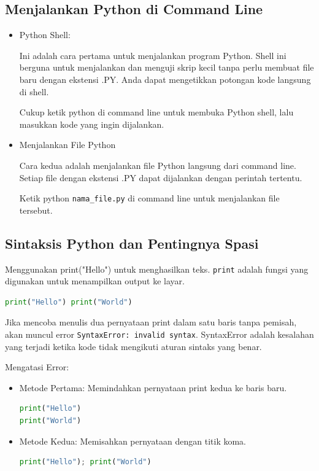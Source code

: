\documentclass{article}
\begin{document}
\subsection{Menjalankan Python di Command Line}
\begin{itemize}
    \item Python Shell:

          Ini adalah cara pertama untuk menjalankan program Python. Shell ini berguna untuk menjalankan dan menguji skrip kecil tanpa perlu membuat file baru dengan ekstensi .PY. Anda dapat mengetikkan potongan kode langsung di shell.

          Cukup ketik python di command line untuk membuka Python shell, lalu masukkan kode yang ingin dijalankan.

    \item Menjalankan File Python

          Cara kedua adalah menjalankan file Python langsung dari command line. Setiap file dengan ekstensi .PY dapat dijalankan dengan perintah tertentu.

          Ketik python \verb|nama_file.py| di command line untuk menjalankan file tersebut.
\end{itemize}

\subsection{Sintaksis Python dan Pentingnya Spasi}
Menggunakan print("Hello") untuk menghasilkan teks. \verb|print| adalah fungsi yang digunakan untuk menampilkan output ke layar.

\begin{lstlisting}[language=Python, caption={}, captionpos=b]
print("Hello") print("World")
\end{lstlisting}

Jika mencoba menulis dua pernyataan print dalam satu baris tanpa pemisah, akan muncul error \verb|SyntaxError: invalid syntax|. SyntaxError adalah kesalahan yang terjadi ketika kode tidak mengikuti aturan sintaks yang benar.

Mengatasi Error:
\begin{itemize}
    \item Metode Pertama: Memindahkan pernyataan print kedua ke baris baru.
          \begin{lstlisting}[language=Python, caption={}, captionpos=b]
print("Hello")
print("World")
    \end{lstlisting}
    \item Metode Kedua: Memisahkan pernyataan dengan titik koma.

          \begin{lstlisting}[language=Python, caption={}, captionpos=b]
print("Hello"); print("World")
    \end{lstlisting}
\end{itemize}
\end{document}
